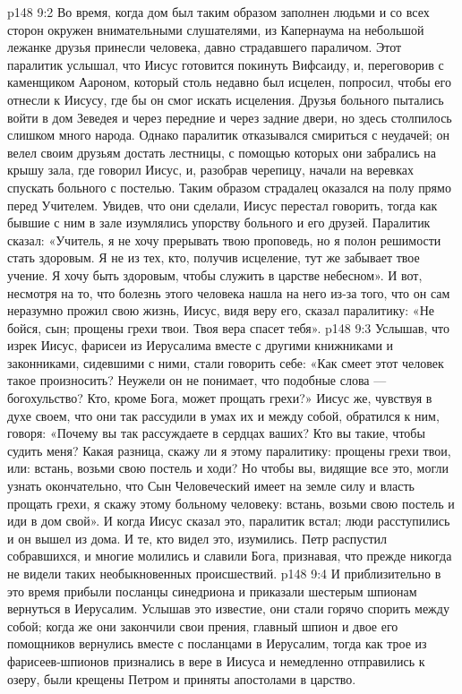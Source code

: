 \vs p148 9:2 Во время, когда дом был таким образом заполнен людьми и со всех сторон окружен внимательными слушателями, из Капернаума на небольшой лежанке друзья принесли человека, давно страдавшего параличом. Этот паралитик услышал, что Иисус готовится покинуть Вифсаиду, и, переговорив с каменщиком Аароном, который столь недавно был исцелен, попросил, чтобы его отнесли к Иисусу, где бы он смог искать исцеления. Друзья больного пытались войти в дом Зеведея и через передние и через задние двери, но здесь столпилось слишком много народа. Однако паралитик отказывался смириться с неудачей; он велел своим друзьям достать лестницы, с помощью которых они забрались на крышу зала, где говорил Иисус, и, разобрав черепицу, начали на веревках спускать больного с постелью. Таким образом страдалец оказался на полу прямо перед Учителем. Увидев, что они сделали, Иисус перестал говорить, тогда как бывшие с ним в зале изумлялись упорству больного и его друзей. Паралитик сказал: «Учитель, я не хочу прерывать твою проповедь, но я полон решимости стать здоровым. Я не из тех, кто, получив исцеление, тут же забывает твое учение. Я хочу быть здоровым, чтобы служить в царстве небесном». И вот, несмотря на то, что болезнь этого человека нашла на него из\hyp{}за того, что он сам неразумно прожил свою жизнь, Иисус, видя веру его, сказал паралитику: «Не бойся, сын; прощены грехи твои. Твоя вера спасет тебя».
\vs p148 9:3 Услышав, что изрек Иисус, фарисеи из Иерусалима вместе с другими книжниками и законниками, сидевшими с ними, стали говорить себе: «Как смеет этот человек такое произносить? Неужели он не понимает, что подобные слова --- богохульство? Кто, кроме Бога, может прощать грехи?» Иисус же, чувствуя в духе своем, что они так рассудили в умах их и между собой, обратился к ним, говоря: «Почему вы так рассуждаете в сердцах ваших? Кто вы такие, чтобы судить меня? Какая разница, скажу ли я этому паралитику: прощены грехи твои, или: встань, возьми свою постель и ходи? Но чтобы вы, видящие все это, могли узнать окончательно, что Сын Человеческий имеет на земле силу и власть прощать грехи, я скажу этому больному человеку: встань, возьми свою постель и иди в дом свой». И когда Иисус сказал это, паралитик встал; люди расступились и он вышел из дома. И те, кто видел это, изумились. Петр распустил собравшихся, и многие молились и славили Бога, признавая, что прежде никогда не видели таких необыкновенных происшествий.
\vs p148 9:4 \pc И приблизительно в это время прибыли посланцы синедриона и приказали шестерым шпионам вернуться в Иерусалим. Услышав это известие, они стали горячо спорить между собой; когда же они закончили свои прения, главный шпион и двое его помощников вернулись вместе с посланцами в Иерусалим, тогда как трое из фарисеев\hyp{}шпионов признались в вере в Иисуса и немедленно отправились к озеру, были крещены Петром и приняты апостолами в царство.
